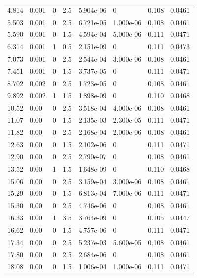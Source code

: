 \documentclass[preview]{standalone}
\begin{document}
{{\begin{tabular}{L{1.2cm}C{1.2cm} C{0.3cm}C{0.5cm} C{1.4cm}C{1.4cm} C{1.4cm}C{1.4cm}}
  4.814  &  0.001  & 0     & 2.5 &  5.904e-06  & 0  & 0.108 &  0.0461   \\ 
  5.503  &  0.001  & 0     & 2.5 &  6.721e-05  & 1.000e-06  & 0.108 &  0.0461   \\ 
  5.590  &  0.001  & 0     & 1.5 &  4.594e-04  & 5.000e-06  & 0.111 &  0.0471   \\ 
  6.314  &  0.001  & 1     & 0.5 &  2.151e-09  & 0  & 0.111 &  0.0473   \\ 
  7.073  &  0.001  & 0     & 2.5 &  2.544e-04  & 3.000e-06  & 0.108 &  0.0461   \\ 
  7.451  &  0.001  & 0     & 1.5 &  3.737e-05  & 0  & 0.111 &  0.0471   \\ 
  8.702  &  0.002  & 0     & 2.5 &  1.723e-05  & 0  & 0.108 &  0.0461   \\ 
  9.892  &  0.002  & 1     & 1.5 &  1.898e-09  & 0  & 0.110 &  0.0468   \\ 
  10.52  &  0.00  & 0     & 2.5 &  3.518e-04  & 4.000e-06  & 0.108 &  0.0461   \\ 
  11.07  &  0.00  & 0     & 1.5 &  2.135e-03  & 2.300e-05  & 0.111 &  0.0471   \\ 
  11.82  &  0.00  & 0     & 2.5 &  2.168e-04  & 2.000e-06  & 0.108 &  0.0461   \\ 
  12.63  &  0.00  & 0     & 1.5 &  2.102e-06  & 0  & 0.111 &  0.0471   \\ 
  12.90  &  0.00  & 0     & 2.5 &  2.790e-07  & 0  & 0.108 &  0.0461   \\ 
  13.52  &  0.00  & 1     & 1.5 &  1.648e-09  & 0  & 0.110 &  0.0468   \\ 
  15.06  &  0.00  & 0     & 2.5 &  3.159e-04  & 3.000e-06  & 0.108 &  0.0461   \\ 
  15.29  &  0.00  & 0     & 1.5 &  6.813e-04  & 7.000e-06  & 0.111 &  0.0471   \\ 
  15.30  &  0.00  & 0     & 2.5 &  4.746e-06  & 0  & 0.108 &  0.0461   \\ 
  16.33  &  0.00  & 1     & 3.5 &  3.764e-09  & 0  & 0.105 &  0.0447   \\ 
  16.62  &  0.00  & 0     & 1.5 &  4.757e-06  & 0  & 0.111 &  0.0471   \\ 
  17.34  &  0.00  & 0     & 2.5 &  5.237e-03  & 5.600e-05  & 0.108 &  0.0461   \\ 
  17.80  &  0.00  & 0     & 2.5 &  2.684e-06  & 0  & 0.108 &  0.0461   \\ 
  18.08  &  0.00  & 0     & 1.5 &  1.006e-04  & 1.000e-06  & 0.111 &  0.0471   \\ 

\end{tabular}}}
\end{document}
